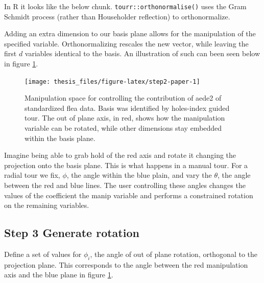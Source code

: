 \documentclass{monashthesis}
\begin{document}
In R it looks like the below chunk. \texttt{tourr::orthonormalise()}
uses the Gram Schmidt process (rather than Householder reflection) to
orthonormalize.

\begin{Shaded}
\begin{Highlighting}[]
\StringTok{ }\NormalTok{(}\NormalTok{, } 
\StringTok{ }
\StringTok{ }\OperatorTok{::}\NormalTok{(}
\end{Highlighting}
\end{Shaded}

Adding an extra dimension to our basis plane allows for the manipulation
of the specified variable. Orthonormalizing rescales the new vector,
while leaving the first \(d\) variables identical to the basis. An
illustration of such can been seen below in figure
\ref{fig:step2-paper}.

\begin{figure}

{\centering \texttt{[image: thesis\_files/figure-latex/step2-paper-1]} 

}

\caption{Manipulation space for controlling the contribution of aede2 of standardized flea data. Basis was identified by holes-index guided tour. The out of plane axis, in red, shows how the manipulation variable can be rotated, while other dimensions stay embedded within the basis plane.}\label{fig:step2-paper}
\end{figure}

Imagine being able to grab hold of the red axis and rotate it changing
the projection onto the basis plane. This is what happens in a manual
tour. For a radial tour we fix, \(\phi\), the angle within the blue
plain, and vary the \(\theta\), the angle between the red and blue
lines. The user controlling these angles changes the values of the
coefficient the manip variable and performs a constrained rotation on
the remaining variables.

\subsection{Step 3 Generate rotation}\label{step-3-generate-rotation-1}

Define a set of values for \(\phi_i\), the angle of out of plane
rotation, orthogonal to the projection plane. This corresponds to the
angle between the red manipulation axis and the blue plane in figure
\ref{fig:step2-paper}.
\end{document}
